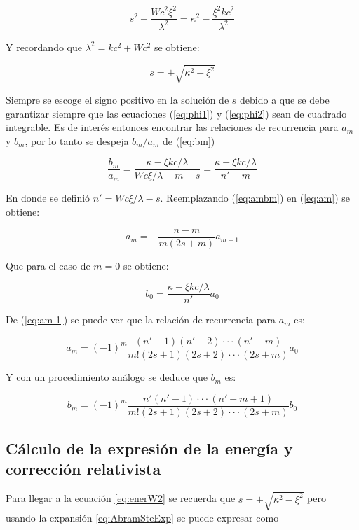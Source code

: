 \documentclass[a4paper, 12pt]{article} %
\begin{document}
\[
s^2 - \dfrac{Wc^2 \xi^2}{\lambda^2} = \kappa^2 - \dfrac{\xi^2 kc^2}{\lambda^2}
\]

Y recordando que $\lambda^2 = kc^2 + Wc^2$ se obtiene:

\[
s = \pm \sqrt{\kappa^2 - \xi^2}
\]

Siempre se escoge el signo positivo en la soluci\'on de $s$ debido a que se debe garantizar siempre
que las ecuaciones (\ref{eq:phi1})  y (\ref{eq:phi2}) sean de cuadrado integrable. Es de inter\'es entonces
encontrar las relaciones de recurrencia para $a_m$ y $b_m$, por lo tanto se despeja $b_m/a_m$ de (\ref{eq:bm})

\begin{equation}\label{eq:ambm}
\dfrac{b_m}{a_m} = \dfrac{\kappa - \xi kc/\lambda}{Wc\xi /\lambda - m - s} = \dfrac{\kappa - \xi kc/\lambda}{n'-m}
\end{equation} 

En donde se defini\'o $n' = Wc \xi /\lambda - s$. Reemplazando (\ref{eq:ambm}) en (\ref{eq:am}) se obtiene:

\begin{equation}\label{eq:am-1}
a_m = - \dfrac{n-m}{m(2s+m)}a_{m-1}
\end{equation} 

Que para el caso de $m=0$ se obtiene:

\begin{equation}
b_0 = \dfrac{\kappa - \xi kc/\lambda}{n'}a_0
\end{equation}

De (\ref{eq:am-1}) se puede ver que la relaci\'on de recurrencia para $a_m$ es:

\begin{equation}
a_m = (-1)^m \dfrac{(n'-1)(n'-2)\cdot\cdot\cdot(n'-m)}{m!(2s+1)(2s+2)\cdot\cdot\cdot(2s+m)}a_0
\end{equation} 

Y con un procedimiento an\'alogo se deduce que $b_m$ es:
 
\begin{equation}
b_m = (-1)^m \dfrac{n'(n'-1)\cdot\cdot\cdot (n'-m +1)}{m!(2s+1)(2s+2)\cdot\cdot\cdot(2s+m)}b_0
\end{equation}

\subsection{C\'alculo de la expresi\'on de la energ\'ia y correcci\'on relativista}

Para llegar a la ecuaci\'on \ref{eq:enerW2} se recuerda que $s=+\sqrt{\kappa^2-\xi^2}$ pero usando la expansi\'on \ref{eq:AbramSteExp} se puede expresar como 
\end{document}
